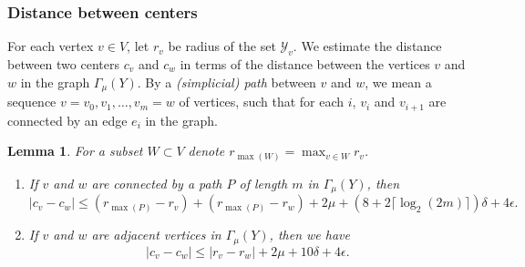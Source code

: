 \documentclass[11pt,letterpaper]{amsart}
\newtheorem{lemma}[theorem]{Lemma}
\begin{document}

\subsubsection*{Distance between centers} 
For each vertex $v\in V$, let $r_v$ be radius of the set $\mathcal Y_v$. %
We estimate the distance between two centers $c_v$ and $c_w$ in terms of the distance between the vertices $v$ and $w$ in the graph $\Gamma_{\mu}(Y)$. 
By a {\it (simplicial) path} between $v$ and $w$, we mean a sequence $v=v_0,v_1,\dots,v_m=w$ of vertices, such that for each $i$, $v_i$ and $v_{i+1}$ are connected by an edge $e_i$ in the graph. 
\begin{lemma}
\label{centerdistance}
For a subset $W\subset V$ denote $r_{\max(W)}=\max_{v\in W}r_v$. 
\begin{enumerate}
\item[1.]
If $v$ and $w$ are connected by a path $P$ of length $m$ in $\Gamma_\mu(Y)$, then 
$$
|c_v-c_w|\leqslant (r_{\max(P)}-r_v)+(r_{\max(P)}-r_w)+2\mu+(8+2\lceil\log_2(2m)\rceil)\delta+4\epsilon.
$$
\item[2.]
If $v$ and $w$ are adjacent vertices in $\Gamma_{\mu}(Y)$, then we have
$$
|c_v-c_w|\leq|r_v-r_w|+2\mu+10\delta+4\epsilon.
$$
\end{enumerate}
\end{lemma}
\end{document}
